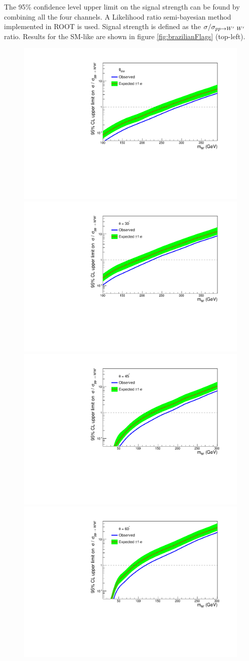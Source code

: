 The 95\% confidence level upper limit on the signal strength can be found by combining all the four channels. A Likelihood ratio semi-bayesian method implemented in ROOT \cite{Brun:1997pa} is used. Signal strength is defined as the $\sigma /\sigma_{pp \to W^\prime~W^\prime~}$ratio. Results for the SM-like \wprime are shown in figure  \ref{fig:brazilianFlags} (top-left). 
\begin{figure}[!htb]
  \centering
  \includegraphics*[width=.45\textwidth]{figs/mix0b.pdf}
  \vspace{3mm}	
  \includegraphics*[width=.45\textwidth]{figs/mix30b.pdf}
  \hspace{3mm}
  \includegraphics*[width=.45\textwidth]{figs/mix45b.pdf}
  \vspace{3mm}	
  \includegraphics*[width=.45\textwidth]{figs/mix60b.pdf}

\end{figure}
